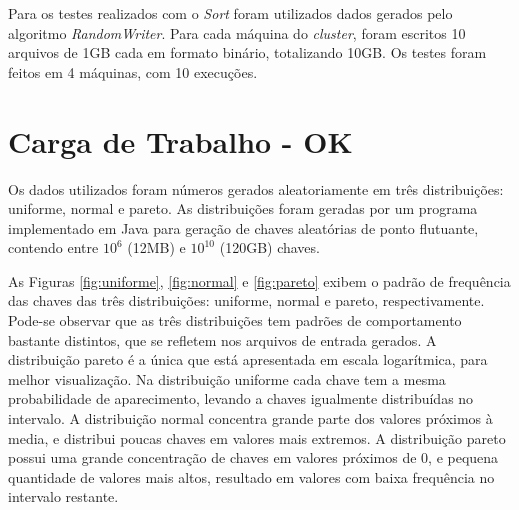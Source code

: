 Para os testes realizados com o \textit{Sort} foram utilizados dados gerados pelo algoritmo \textit{RandomWriter}. Para cada máquina do \textit{cluster}, foram escritos 10 arquivos de 1GB cada em formato binário, totalizando 10GB. Os testes foram feitos em 4 máquinas, com 10 execuções. 


\section{Carga de Trabalho - OK}

Os dados utilizados foram números gerados aleatoriamente em três distribuições: uniforme, normal e pareto. As distribuições foram geradas por um programa implementado em Java para geração de chaves aleatórias de ponto flutuante, contendo entre $10^{6}$ (12MB) e  $10^{10}$ (120GB) chaves. 

As Figuras \ref{fig:uniforme}, \ref{fig:normal} e \ref{fig:pareto} exibem o padrão de frequência das chaves das três distribuições: uniforme, normal e pareto, respectivamente. 
Pode-se observar que as três distribuições tem padrões de comportamento bastante distintos, que se refletem nos arquivos de entrada gerados. A distribuição pareto é a única que está apresentada em escala logarítmica, para melhor visualização. 
Na distribuição uniforme cada chave tem a mesma probabilidade de aparecimento, levando a chaves igualmente distribuídas no intervalo. A distribuição normal concentra grande parte dos valores próximos à media, e distribui poucas chaves em valores mais extremos. A distribuição pareto possui uma grande concentração de chaves em valores próximos de 0, e pequena quantidade de valores mais altos, resultado em valores com baixa frequência no intervalo restante. %

